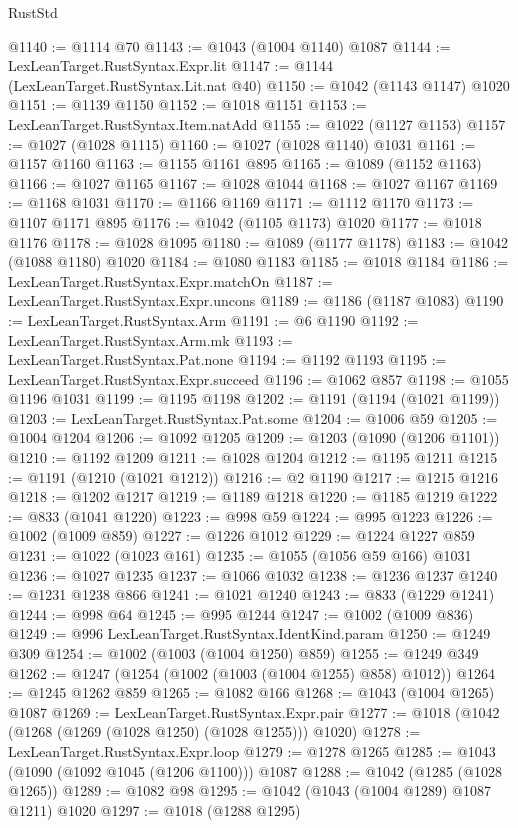 \begin{lexlean}{RustStd}
\begin{coremodule}
@1140 := @1114 @70
@1143 := @1043 (@1004 @1140) @1087
@1144 := LexLeanTarget.RustSyntax.Expr.lit
@1147 := @1144 (LexLeanTarget.RustSyntax.Lit.nat @40)
@1150 := @1042 (@1143 @1147) @1020
@1151 := @1139 @1150
@1152 := @1018 @1151
@1153 := LexLeanTarget.RustSyntax.Item.natAdd
@1155 := @1022 (@1127 @1153)
@1157 := @1027 (@1028 @1115)
@1160 := @1027 (@1028 @1140) @1031
@1161 := @1157 @1160
@1163 := @1155 @1161 @895
@1165 := @1089 (@1152 @1163)
@1166 := @1027 @1165
@1167 := @1028 @1044
@1168 := @1027 @1167
@1169 := @1168 @1031
@1170 := @1166 @1169
@1171 := @1112 @1170
@1173 := @1107 @1171 @895
@1176 := @1042 (@1105 @1173) @1020
@1177 := @1018 @1176
@1178 := @1028 @1095
@1180 := @1089 (@1177 @1178)
@1183 := @1042 (@1088 @1180) @1020
@1184 := @1080 @1183
@1185 := @1018 @1184
@1186 := LexLeanTarget.RustSyntax.Expr.matchOn
@1187 := LexLeanTarget.RustSyntax.Expr.uncons
@1189 := @1186 (@1187 @1083)
@1190 := LexLeanTarget.RustSyntax.Arm
@1191 := @6 @1190
@1192 := LexLeanTarget.RustSyntax.Arm.mk
@1193 := LexLeanTarget.RustSyntax.Pat.none
@1194 := @1192 @1193
@1195 := LexLeanTarget.RustSyntax.Expr.succeed
@1196 := @1062 @857
@1198 := @1055 @1196 @1031
@1199 := @1195 @1198
@1202 := @1191 (@1194 (@1021 @1199))
@1203 := LexLeanTarget.RustSyntax.Pat.some
@1204 := @1006 @59
@1205 := @1004 @1204
@1206 := @1092 @1205
@1209 := @1203 (@1090 (@1206 @1101))
@1210 := @1192 @1209
@1211 := @1028 @1204
@1212 := @1195 @1211
@1215 := @1191 (@1210 (@1021 @1212))
@1216 := @2 @1190
@1217 := @1215 @1216
@1218 := @1202 @1217
@1219 := @1189 @1218
@1220 := @1185 @1219
@1222 := @833 (@1041 @1220)
@1223 := @998 @59
@1224 := @995 @1223
@1226 := @1002 (@1009 @859)
@1227 := @1226 @1012
@1229 := @1224 @1227 @859
@1231 := @1022 (@1023 @161)
@1235 := @1055 (@1056 @59 @166) @1031
@1236 := @1027 @1235
@1237 := @1066 @1032
@1238 := @1236 @1237
@1240 := @1231 @1238 @866
@1241 := @1021 @1240
@1243 := @833 (@1229 @1241)
@1244 := @998 @64
@1245 := @995 @1244
@1247 := @1002 (@1009 @836)
@1249 := @996 LexLeanTarget.RustSyntax.IdentKind.param
@1250 := @1249 @309
@1254 := @1002 (@1003 (@1004 @1250) @859)
@1255 := @1249 @349
@1262 := @1247 (@1254 (@1002 (@1003 (@1004 @1255) @858) @1012))
@1264 := @1245 @1262 @859
@1265 := @1082 @166
@1268 := @1043 (@1004 @1265) @1087
@1269 := LexLeanTarget.RustSyntax.Expr.pair
@1277 := @1018 (@1042 (@1268 (@1269 (@1028 @1250) (@1028 @1255))) @1020)
@1278 := LexLeanTarget.RustSyntax.Expr.loop
@1279 := @1278 @1265
@1285 := @1043 (@1090 (@1092 @1045 (@1206 @1100))) @1087
@1288 := @1042 (@1285 (@1028 @1265))
@1289 := @1082 @98
@1295 := @1042 (@1043 (@1004 @1289) @1087 @1211) @1020
@1297 := @1018 (@1288 @1295)

\end{coremodule}
\end{lexlean}
